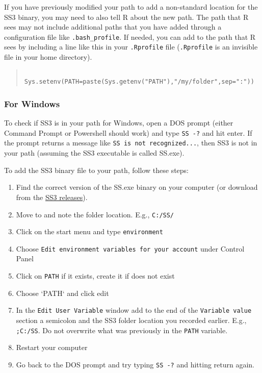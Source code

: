 If you have previously modified your path to add a non-standard location for the SS3 binary, you may need to also tell R about the new path. The path that R sees may not include additional paths that you have added through a configuration file like \texttt{.bash\_profile}. If needed, you can add to the path that R sees by including a line like this in your \texttt{.Rprofile} file (\texttt{.Rprofile} is an invisible file in your home directory).

\begin{quote}
   \begin{verbatim}
    Sys.setenv(PATH=paste(Sys.getenv("PATH"),"/my/folder",sep=":"))
    \end{verbatim}
\end{quote}

\subsubsection{For Windows}

To check if SS3 is in your path for Windows, open a DOS prompt (either Command Prompt or Powershell should work) and type \texttt{SS -?} and hit enter. If the prompt returns a message like \texttt{SS is not recognized...}, then SS3 is not in your path (assuming the SS3 executable is called SS.exe).

To add the SS3 binary file to your path, follow these steps:

\begin{enumerate}
  \item Find the correct version of the SS.exe binary on your computer (or download from the \href{https://github.com/nmfs-stock-synthesis/stock-synthesis/releases}{SS3 releases}).
  \item Move to and note the folder location. E.g., \texttt{C:/SS/}
  \item Click on the start menu and type \texttt{environment}
  \item Choose \texttt{Edit environment variables for your account} under Control Panel
  \item Click on \texttt{PATH} if it exists, create it if does not exist 
  \item Choose `PATH` and click edit
  \item In the \texttt{Edit User Variable} window add to the end of the \texttt{Variable value} section a semicolon and the SS3 folder location you recorded earlier.
     E.g., \texttt{;C:/SS}. Do not overwrite what was previously in the \texttt{PATH} variable.
  \item Restart your computer
  \item Go back to the DOS prompt and try typing \texttt{SS -?} and hitting return again.
\end{enumerate}


